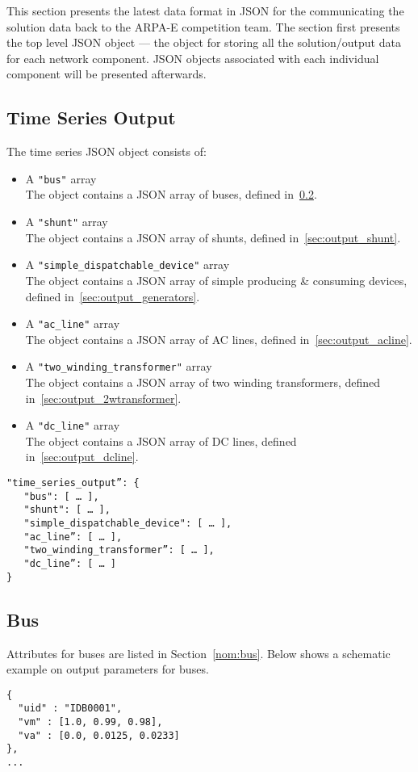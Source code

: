 \label{sec:solution_format}
This section presents the latest data format in JSON for the 
communicating the solution data back to the ARPA-E competition team.
The section first presents the top level JSON object --- the
object for storing all the solution/output data 
for each network component.
JSON objects associated with each individual component will be presented afterwards.


\label{sec:output_data}
\subsection{Time Series Output}
The time series JSON object consists of:
\begin{itemize}
    \item A \texttt{"bus"} array\\
    The object contains a JSON array of buses, defined in~\ref{sec:output_bus}.
    \item A \texttt{"shunt"} array\\
    The object contains a JSON array of shunts, defined in~\ref{sec:output_shunt}.
    \item A \texttt{"simple\_dispatchable\_device"} array\\
    The object contains a JSON array of simple producing \& consuming devices, defined in~\ref{sec:output_generators}.
    \item A \texttt{"ac\_line"} array\\
    The object contains a JSON array of AC lines, defined in~\ref{sec:output_acline}.
    \item A \texttt{"two\_winding\_transformer"} array\\
    The object contains a JSON array of two winding transformers, defined in~\ref{sec:output_2wtransformer}.
    \item A \texttt{"dc\_line"} array\\
    The object contains a JSON array of DC lines, defined in~\ref{sec:output_dcline}.
\end{itemize}


\begin{verbatim}
"time_series_output”: {
   "bus": [ … ],
   "shunt": [ … ],
   "simple_dispatchable_device": [ … ],
   "ac_line”: [ … ],
   "two_winding_transformer”: [ … ],
   "dc_line”: [ … ]
}    
\end{verbatim}

\subsection{Bus}
\label{sec:output_bus}
Attributes for buses are listed in Section~\ref{nom:bus}.
Below shows a schematic example on output parameters for buses.
\begin{verbatim}
{
  "uid" : "IDB0001",
  "vm" : [1.0, 0.99, 0.98],
  "va" : [0.0, 0.0125, 0.0233]
},
...
\end{verbatim}
    
